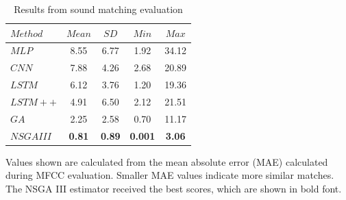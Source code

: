 \begin{table}[t]
\centering
\caption{Results from sound matching evaluation}
\label{tbl:sound_match_eval}
\begin{threeparttable}
\begin{tabular}{l|cccc}
\toprule
$Method$ & $Mean$ & $SD$ & $Min$ & $Max$ \\
\midrule
$MLP$ & 8.55 & 6.77 & 1.92 & 34.12 \\
$CNN$ & 7.88 & 4.26 & 2.68 & 20.89 \\
$LSTM$ & 6.12 & 3.76 & 1.20 & 19.36 \\
$LSTM++$ & 4.91 & 6.50 & 2.12 & 21.51 \\
$GA$ & 2.25 & 2.58 & 0.70 & 11.17 \\
$NSGA III$ & \textbf{0.81} & \textbf{0.89} & \textbf{0.001} & \textbf{3.06} \\
\bottomrule
\end{tabular}
\begin{tablenotes}
\footnotesize
\item Values shown are calculated from the mean absolute error (MAE) calculated during MFCC evaluation. Smaller MAE values indicate more similar matches. The NSGA III estimator received the best scores, which are shown in bold font.
\end{tablenotes}
\end{threeparttable}
\end{table}


